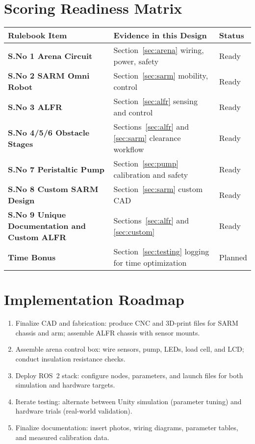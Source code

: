 \documentclass[12pt]{article}
\begin{document}
\section{Scoring Readiness Matrix}
\begin{tabularx}{\textwidth}{>{\bfseries}lYY}
\toprule
Rulebook Item & Evidence in this Design & Status \\
\midrule
S.No 1 Arena Circuit & Section~\ref{sec:arena} wiring, power, safety & Ready \\
S.No 2 SARM Omni Robot & Section~\ref{sec:sarm} mobility, control & Ready \\
S.No 3 ALFR & Section~\ref{sec:alfr} sensing and control & Ready \\
S.No 4/5/6 Obstacle Stages & Sections~\ref{sec:alfr} and \ref{sec:sarm} clearance workflow & Ready \\
S.No 7 Peristaltic Pump & Section~\ref{sec:pump} calibration and safety & Ready \\
S.No 8 Custom SARM Design & Section~\ref{sec:sarm} custom CAD & Ready \\
S.No 9 Unique Documentation and Custom ALFR & Sections~\ref{sec:alfr} and \ref{sec:custom} & Ready \\
Time Bonus & Section~\ref{sec:testing} logging for time optimization & Planned \\
\bottomrule
\end{tabularx}

\section{Implementation Roadmap}
\begin{enumerate}
    \item Finalize CAD and fabrication: produce CNC and 3D-print files for SARM chassis and arm; assemble ALFR chassis with sensor mounts.
    \item Assemble arena control box: wire sensors, pump, LEDs, load cell, and LCD; conduct insulation resistance checks.
    \item Deploy ROS~2 stack: configure nodes, parameters, and launch files for both simulation and hardware targets.
    \item Iterate testing: alternate between Unity simulation (parameter tuning) and hardware trials (real-world validation).
    \item Finalize documentation: insert photos, wiring diagrams, parameter tables, and measured calibration data.
\end{enumerate}
\end{document}
